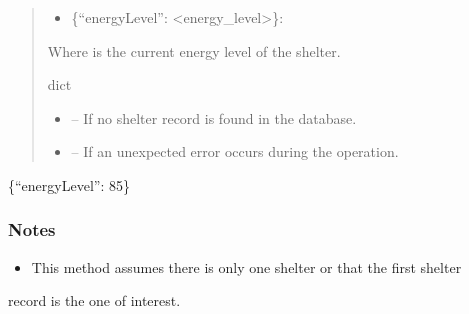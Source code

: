 \documentclass[letterpaper,10pt,english]{sphinxmanual}
\begin{document}
\begin{fulllineitems}
\begin{fulllineitems}
\begin{quote}
\begin{description}
\sphinxAtStartPar
\begin{description}
\begin{itemize}
\item {} 
\sphinxAtStartPar
\{“energyLevel”: <energy\_level>\}:

\end{itemize}

\sphinxAtStartPar
Where  is the current energy level of the shelter.

\end{description}


\sphinxAtStartPar
dict

\begin{itemize}
\item {} 
\sphinxAtStartPar
{} – If no shelter record is found in the database.

\item {} 
\sphinxAtStartPar
{} – If an unexpected error occurs during the operation.

\end{itemize}

\end{description}\end{quote}
\begin{description}
\sphinxAtStartPar
\{“energyLevel”: 85\}

\end{description}
\subsubsection*{Notes}
\begin{itemize}
\item {} 
\sphinxAtStartPar
This method assumes there is only one shelter or that the first shelter

\end{itemize}

\sphinxAtStartPar
record is the one of interest.

\end{fulllineitems}



\end{fulllineitems}
\end{document}
